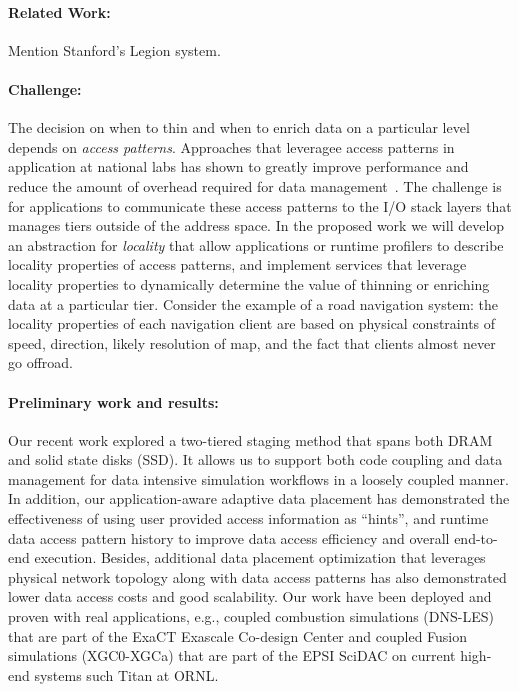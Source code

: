 \paragraph{Related Work:} Mention Stanford's Legion system.

\paragraph{Challenge:} The decision on when to thin and when to
enrich data on a particular level depends on \emph{access patterns}.
Approaches that leveragee access patterns in application at national
labs has shown to greatly improve performance and reduce the amount
of overhead required for data management~\cite{he:hpdc13}. The
challenge is for applications to communicate these access patterns
to the I/O stack layers that manages tiers outside of the address
space. In the proposed work we will develop an abstraction for
\emph{locality} that allow applications or runtime profilers to
describe locality properties of access patterns, and implement
services that leverage locality properties to dynamically determine
the value of thinning or enriching data at a particular tier.
Consider the example of a road navigation system: the locality
properties of each navigation client are based on physical constraints
of speed, direction, likely resolution of map, and the fact that
clients almost never go offroad.

\paragraph{Preliminary work and results:} Our recent work \cite{tongipdps15}
explored a two-tiered staging method that spans both DRAM and solid state
disks (SSD). It allows us to support both code coupling and data management
for data intensive simulation workflows in a loosely coupled manner. In
addition, our application-aware adaptive data placement has demonstrated the
effectiveness of using user provided access information as ``hints'', and
runtime data access pattern history to improve data access efficiency and
overall end-to-end execution. Besides, additional data placement
optimization \cite{qiansc15} that leverages physical network topology along
with data access patterns has also demonstrated lower data access costs and
good scalability. Our work have been deployed and proven with real
applications, e.g., coupled combustion simulations (DNS-LES) that are part
of the ExaCT Exascale Co-design Center and coupled Fusion simulations
(XGC0-XGCa) that are part of the EPSI SciDAC on current high-end systems
such Titan at ORNL.

